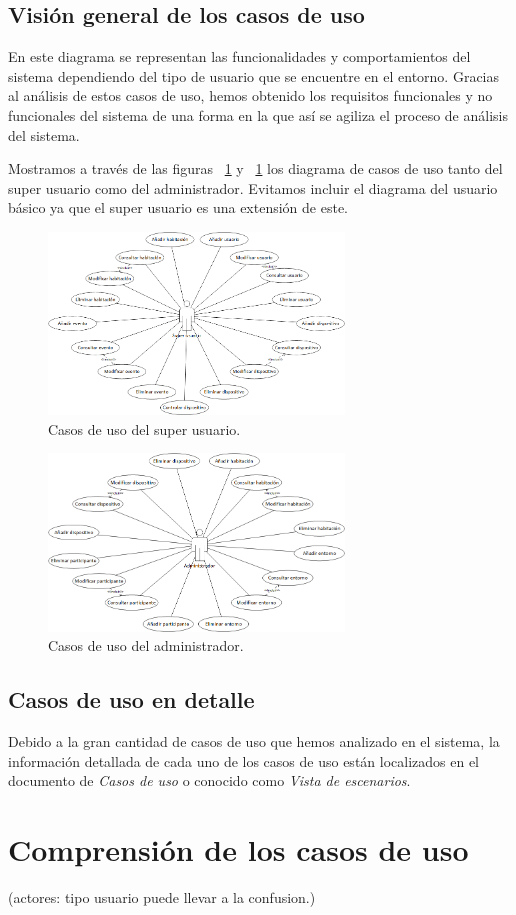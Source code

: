 \subsection{Visión general de los casos de uso}
En este diagrama se representan las funcionalidades y comportamientos del sistema dependiendo del tipo de usuario que se encuentre en el entorno. Gracias al análisis de estos casos de uso, hemos obtenido los requisitos funcionales y no funcionales del sistema de una forma en la que así se agiliza el proceso de análisis del sistema.
 
Mostramos a través de las figuras ~\ref{fig:cuSuperusuario} y ~\ref{fig:cuSuperusuario} los diagrama de casos de uso tanto del super usuario como del administrador. Evitamos incluir el diagrama del usuario básico ya que el super usuario es una extensión de este.

\begin{figure}[h!]
	\centering
	\includegraphics[width=0.7\textwidth]{4.Disenio/Imagenes/CU-Superusuario}
	\caption{Casos de uso del super usuario.}
	\label{fig:cuSuperusuario}
\end{figure}

\begin{figure}[h!]
	\centering
	\includegraphics[width=0.7\textwidth]{4.Disenio/Imagenes/CU-Admin}
	\caption{Casos de uso del administrador.}
	\label{fig:cuAdmin}
\end{figure}


\subsection{Casos de uso en detalle}
Debido a la gran cantidad de casos de uso que hemos analizado en el sistema, la información detallada de cada uno de los casos de uso están localizados en el documento de \textit{Casos de uso} o conocido como \textit{Vista de escenarios}.
\section{Comprensión de los casos de uso}
(actores: tipo usuario puede llevar a la confusion.)